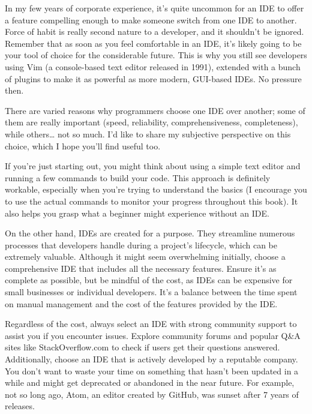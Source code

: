 In my few years of corporate experience, it’s quite uncommon for an IDE to offer a feature compelling enough to make someone switch from one IDE to another. Force of habit is really second nature to a developer, and it shouldn’t be ignored. Remember that as soon as you feel comfortable in an IDE, it’s likely going to be your tool of choice for the considerable future. This is why you still see developers using Vim (a console-based text editor released in 1991), extended with a bunch of plugins to make it as powerful as more modern, GUI-based IDEs. No pressure then.

There are varied reasons why programmers choose one IDE over another; some of them are really important (speed, reliability, comprehensiveness, completeness), while others… not so much. I’d like to share my subjective perspective on this choice, which I hope you’ll find useful too.


If you’re just starting out, you might think about using a simple text editor and running a few commands to build your code. This approach is definitely workable, especially when you’re trying to understand the basics (I encourage you to use the actual commands to monitor your progress throughout this book). It also helps you grasp what a beginner might experience without an IDE.

On the other hand, IDEs are created for a purpose. They streamline numerous processes that developers handle during a project’s lifecycle, which can be extremely valuable. Although it might seem overwhelming initially, choose a comprehensive IDE that includes all the necessary features. Ensure it’s as complete as possible, but be mindful of the cost, as IDEs can be expensive for small businesses or individual developers. It’s a balance between the time spent on manual management and the cost of the features provided by the IDE.

Regardless of the cost, always select an IDE with strong community support to assist you if you encounter issues. Explore community forums and popular Q\&A sites like StackOverflow.com to check if users get their questions answered. Additionally, choose an IDE that is actively developed by a reputable company. You don’t want to waste your time on something that hasn’t been updated in a while and might get deprecated or abandoned in the near future. For example, not so long ago, Atom, an editor created by GitHub, was sunset after 7 years of releases.

